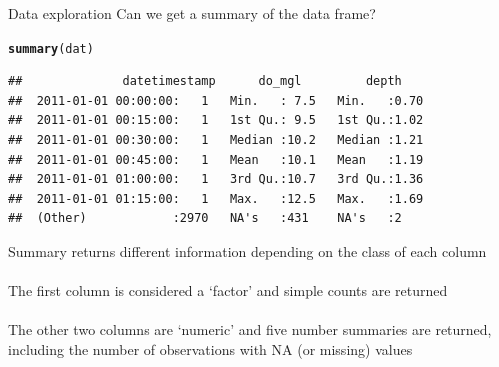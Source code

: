 \documentclass[xcolor=svgnames]{beamer}\usepackage[]{graphicx}\usepackage[]{color}
\makeatletter
\newcommand{\hlstd}[1]{\textcolor[rgb]{0.345,0.345,0.345}{#1}}%
\newcommand{\hlkwd}[1]{\textcolor[rgb]{0.737,0.353,0.396}{\textbf{#1}}}%
\newenvironment{kframe}{%
 \def\at@end@of@kframe{}%
 \ifinner\ifhmode%
  \def\at@end@of@kframe{\end{minipage}}%
  \begin{minipage}{\columnwidth}%
 \fi\fi%
 \def\FrameCommand##1{\hskip\@totalleftmargin \hskip-\fboxsep
 \colorbox{shadecolor}{##1}\hskip-\fboxsep
     \hskip-\linewidth \hskip-\@totalleftmargin \hskip\columnwidth}%
 \MakeFramed {\advance\hsize-\width
   \@totalleftmargin\z@ \linewidth\hsize
   \@setminipage}}%
 {\par\unskip\endMakeFramed%
 \at@end@of@kframe}
\newenvironment{knitrout}{}{} %
\makeatother
\begin{document}
\begin{frame}[fragile]{Data exploration}
Can we get a summary of the data frame?
\begin{knitrout}\scriptsize
{}\color{fgcolor}\begin{kframe}
\begin{alltt}
\hlkwd{summary}\hlstd{(dat)}
\end{alltt}
\begin{verbatim}
##              datetimestamp      do_mgl         depth     
##  2011-01-01 00:00:00:   1   Min.   : 7.5   Min.   :0.70  
##  2011-01-01 00:15:00:   1   1st Qu.: 9.5   1st Qu.:1.02  
##  2011-01-01 00:30:00:   1   Median :10.2   Median :1.21  
##  2011-01-01 00:45:00:   1   Mean   :10.1   Mean   :1.19  
##  2011-01-01 01:00:00:   1   3rd Qu.:10.7   3rd Qu.:1.36  
##  2011-01-01 01:15:00:   1   Max.   :12.5   Max.   :1.69  
##  (Other)            :2970   NA's   :431    NA's   :2
\end{verbatim}
\end{kframe}
\end{knitrout}
Summary returns different information depending on the class of each column\\~\\
The first column is considered a `factor' and simple counts are returned\\~\\
The other two columns are `numeric' and five number summaries are returned, including the number of observations with NA (or missing) values
\end{frame}
\end{document}

